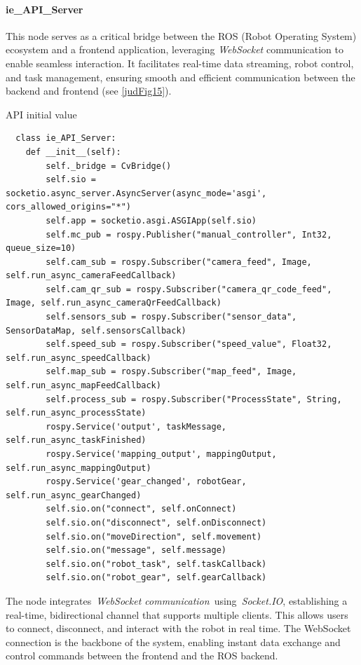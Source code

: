 \documentclass[../../main]{subfiles}
\begin{document}
\paragraph{ie\_API\_Server}

This node serves as a critical bridge between the ROS (Robot Operating
System) ecosystem and a frontend application, leveraging
\emph{WebSocket} communication to enable seamless interaction. It
facilitates real-time data streaming, robot control, and task
management, ensuring smooth and efficient communication between the
backend and frontend (see \cref{judFig15}).

\begin{codebox}[label=judFig16]{API initial value}
  \begin{verbatim}
  class ie_API_Server:
    def __init__(self):
        self._bridge = CvBridge()
        self.sio = socketio.async_server.AsyncServer(async_mode='asgi', cors_allowed_origins="*")
        self.app = socketio.asgi.ASGIApp(self.sio)
        self.mc_pub = rospy.Publisher("manual_controller", Int32, queue_size=10)
        self.cam_sub = rospy.Subscriber("camera_feed", Image, self.run_async_cameraFeedCallback)
        self.cam_qr_sub = rospy.Subscriber("camera_qr_code_feed", Image, self.run_async_cameraQrFeedCallback)
        self.sensors_sub = rospy.Subscriber("sensor_data", SensorDataMap, self.sensorsCallback)
        self.speed_sub = rospy.Subscriber("speed_value", Float32, self.run_async_speedCallback)
        self.map_sub = rospy.Subscriber("map_feed", Image, self.run_async_mapFeedCallback)
        self.process_sub = rospy.Subscriber("ProcessState", String, self.run_async_processState)
        rospy.Service('output', taskMessage, self.run_async_taskFinished)
        rospy.Service('mapping_output', mappingOutput, self.run_async_mappingOutput)
        rospy.Service('gear_changed', robotGear, self.run_async_gearChanged)
        self.sio.on("connect", self.onConnect)
        self.sio.on("disconnect", self.onDisconnect)
        self.sio.on("moveDirection", self.movement)
        self.sio.on("message", self.message)
        self.sio.on("robot_task", self.taskCallback)
        self.sio.on("robot_gear", self.gearCallback)
\end{verbatim}
\end{codebox}

The node integrates~\emph{WebSocket
communication}~using~\emph{Socket.IO}, establishing a real-time,
bidirectional channel that supports multiple clients. This allows users
to connect, disconnect, and interact with the robot in real time. The
WebSocket connection is the backbone of the system, enabling instant
data exchange and control commands between the frontend and the ROS
backend.
\end{document}
